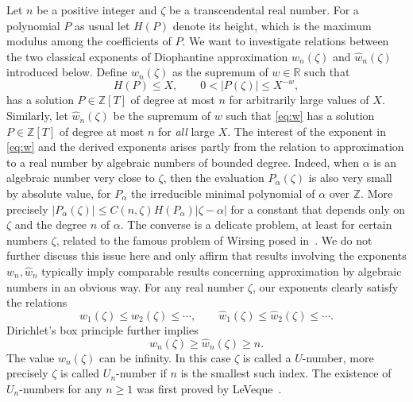 \documentclass[12pt]{amsart}
\theoremstyle{definition}
\begin{document}
Let $n$ be a positive integer and $\zeta$ be a transcendental real number. 
For a polynomial $P$ as usual let $H(P)$ denote its height, 
which is the maximum modulus among the coefficients of $P$. 
We want to investigate relations between the two classical exponents of Diophantine approximation
$w_{n}(\zeta)$ and $\widehat{w}_{n}(\zeta)$ introduced below.
Define $w_{n}(\zeta)$ as the supremum 
of $w\in{\mathbb{R}}$ such that
\begin{equation}  \label{eq:w}
H(P) \leq X, \qquad  0<\vert P(\zeta)\vert \leq X^{-w},  
\end{equation}
has a solution $P\in\mathbb{Z}[T]$ of degree at most $n$ for arbitrarily large values of $X$.
Similarly, let $\widehat{w}_{n}(\zeta)$ be the supremum of $w$ such that \eqref{eq:w}
has a solution $P\in\mathbb{Z}[T]$ of degree at most $n$ for {\em all} large $X$.
The interest of the exponent in \eqref{eq:w} and the derived exponents
arises partly from the relation to approximation to a real number
by algebraic numbers of bounded degree. Indeed, when $\alpha$ is an algebraic number very close to $\zeta$, 
then the evaluation $P_{\alpha}(\zeta)$ is also very small by absolute value, for $P_{\alpha}$ the irreducible 
minimal polynomial of $\alpha$ over $\mathbb{Z}$.
More precisely $\vert P_{\alpha}(\zeta)\vert \leq C(n,\zeta) H(P_{\alpha})\vert \zeta-\alpha\vert$ for a constant 
that depends only on $\zeta$ and the degree $n$ of $\alpha$.
The converse is a delicate problem, at least for certain 
numbers $\zeta$, related to the famous problem
of Wirsing posed in~\cite{wirsing}.
We do not further discuss this issue here and only affirm that results involving the exponents $w_{n}, \widehat{w}_{n}$
typically imply comparable results concerning approximation by algebraic numbers in an obvious way.
For any real number $\zeta$, our exponents clearly 
satisfy the relations
\begin{equation} \label{eq:wmonos}
w_{1}(\zeta)\leq w_{2}(\zeta)\leq \cdots, 
\qquad \widehat{w}_{1}(\zeta)\leq \widehat{w}_{2}(\zeta)\leq \cdots. 
\end{equation}
Dirichlet's box principle further implies
\begin{equation} \label{eq:wmono}
w_{n}(\zeta)\geq \widehat{w}_{n}(\zeta)\geq n.
\end{equation}
The value $w_{n}(\zeta)$ can be infinity. In this case $\zeta$ is called a $U$-number, more precisely
$\zeta$ is called $U_{n}$-number if $n$ is the smallest such index. 
The existence of $U_{n}$-numbers for any $n\geq 1$ was first proved by LeVeque~\cite{leveque}. 
\end{document}
